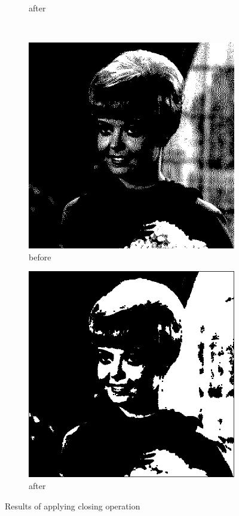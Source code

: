 \documentclass[12pt]{article}
\renewcommand{\subfiguresize}{.25\textwidth}
\begin{document}
\begin{figure}[H]
\begin{subfigure}[t]{\subfiguresize}
        \caption{after}
    \end{subfigure}\\[1em]
    \begin{subfigure}[t]{\subfiguresize}\centering
        \includegraphics[width=\textwidth]{img/magda/girlbw.png}
        \caption{before}
    \end{subfigure}
    \hspace{2em}
    \begin{subfigure}[t]{\subfiguresize}\centering
         \includegraphics[width=\textwidth]{img/magda/output5.png}
        \caption{after}
    \end{subfigure}
    \caption{Results of applying closing operation}
\end{figure}  
\end{document}
